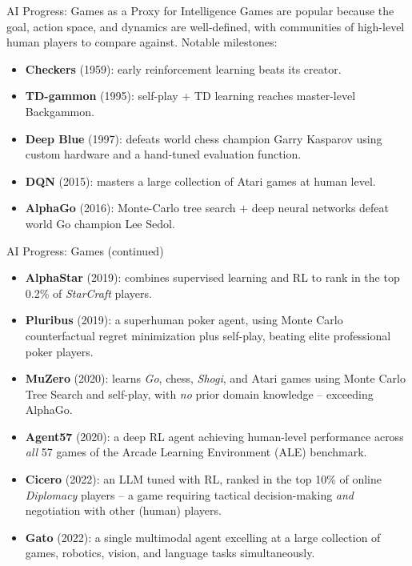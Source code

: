 \documentclass[aspectratio=169,10pt]{beamer}
\begin{document}
\begin{frame}{AI Progress: Games as a Proxy for Intelligence}
  Games are popular because the goal, action space, and dynamics are
  well-defined, with communities of high-level human players to compare
  against. Notable milestones:
  \begin{itemize}
    \item \textbf{Checkers} (1959): early reinforcement learning beats its
      creator.
    \item \textbf{TD-gammon} (1995): self-play + TD learning reaches
      master-level Backgammon.
    \item \textbf{Deep Blue} (1997): defeats world chess champion Garry
      Kasparov using custom hardware and a hand-tuned evaluation function.
    \item \textbf{DQN} (2015): masters a large collection of Atari games at
      human level.
    \item \textbf{AlphaGo} (2016): Monte-Carlo tree search $+$ deep neural
      networks defeat world Go champion Lee Sedol.
  \end{itemize}
\end{frame}

\begin{frame}[allowframebreaks]{AI Progress: Games (continued)}
  \begin{itemize}
    \item \textbf{AlphaStar} (2019): combines supervised learning and RL to
      rank in the top 0.2\% of \emph{StarCraft} players.
    \item \textbf{Pluribus} (2019): a superhuman poker agent, using Monte
      Carlo counterfactual regret minimization plus self-play, beating
      elite professional poker players.
    \item \textbf{MuZero} (2020): learns \emph{Go}, chess, \emph{Shogi},
      and Atari games using Monte Carlo Tree Search and self-play, with
      \emph{no} prior domain knowledge -- exceeding AlphaGo.
    \item \textbf{Agent57} (2020): a deep RL agent achieving human-level
      performance across \emph{all} 57 games of the Arcade Learning
      Environment (ALE) benchmark.
    \item \textbf{Cicero} (2022): an LLM tuned with RL, ranked in the top
      10\% of online \emph{Diplomacy} players -- a game requiring tactical
      decision-making \emph{and} negotiation with other (human) players.
    \item \textbf{Gato} (2022): a single multimodal agent excelling at a
      large collection of games, robotics, vision, and language tasks
      simultaneously.
  \end{itemize}
\end{frame}
\end{document}
